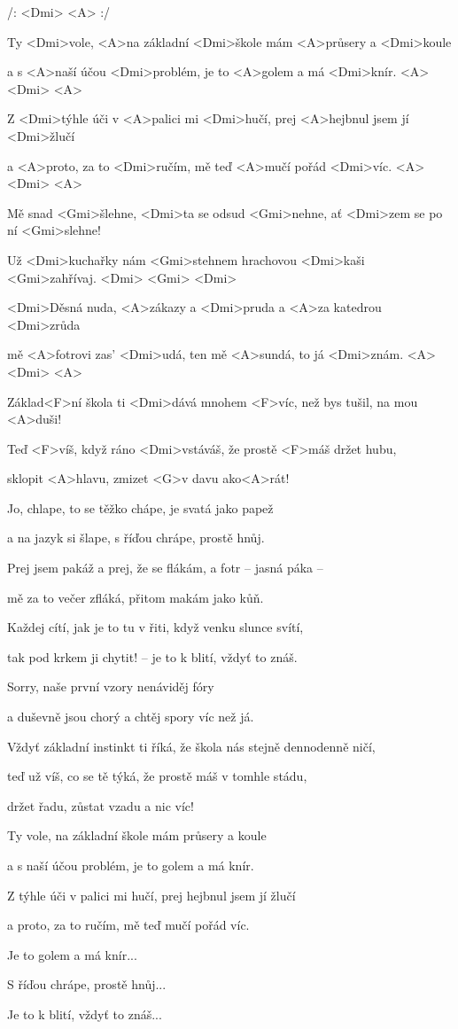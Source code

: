 

/: <Dmi> <A> :/ 

\zs
Ty <Dmi>vole, <A>na základní <Dmi>škole
mám <A>průsery a <Dmi>koule 

a s <A>naší účou <Dmi>problém,
je to <A>golem a má <Dmi>knír. <A> <Dmi> <A>

Z <Dmi>týhle úči v <A>palici mi <Dmi>hučí,
prej <A>hejbnul jsem jí <Dmi>žlučí 

a <A>proto, za to <Dmi>ručím,
mě teď <A>mučí pořád <Dmi>víc. <A> <Dmi> <A>
\ks

\zs

Mě snad <Gmi>šlehne, <Dmi>ta se odsud <Gmi>nehne,
ať <Dmi>zem se po ní <Gmi>slehne! 

Už <Dmi>kuchařky nám <Gmi>stehnem
hrachovou <Dmi>kaši <Gmi>zahřívaj. <Dmi> <Gmi> <Dmi>

<Dmi>Děsná nuda, <A>zákazy a <Dmi>pruda
a <A>za katedrou <Dmi>zrůda

mě <A>fotrovi zas' <Dmi>udá,
ten mě <A>sundá, to já <Dmi>znám. <A> <Dmi> <A> 

\ks

\zr
Základ<F>ní škola ti <Dmi>dává
mnohem <F>víc, než bys tušil, na mou <A>duši!

Teď <F>víš, když ráno <Dmi>vstáváš,
že prostě <F>máš držet hubu, 

sklopit <A>hlavu, zmizet <G>v davu ako<A>rát!
\kr

\zs
Jo, chlape, to se těžko chápe, je svatá jako papež 

a na jazyk si šlape, s říďou chrápe, prostě hnůj.

Prej jsem pakáž a prej, že se flákám, a fotr -- jasná páka --

mě za to večer zfláká, přitom makám jako kůň.

\ks

\zs

Každej cítí, jak je to tu v řiti, když venku slunce svítí,

tak pod krkem ji chytit! -- je to k blití, vždyť to znáš.

Sorry, naše první vzory nenáviděj fóry 

a duševně jsou chorý a chtěj spory víc než já.
\ks

\zr
Vždyť základní instinkt ti říká, že škola nás stejně dennodenně ničí,

teď už víš, co se tě týká, že prostě máš v tomhle stádu,

držet řadu, zůstat vzadu a nic víc!
\kr 

\zs
Ty vole, na základní škole mám průsery a koule 

a s naší účou problém, je to golem a má knír.
\ks

\zs
Z týhle úči v palici mi hučí, prej hejbnul jsem jí žlučí 

a proto, za to ručím, mě teď mučí pořád víc.

Je to golem a má knír...
 
S říďou chrápe, prostě hnůj...
 
Je to k blití, vždyť to znáš...
\ks

\kp
